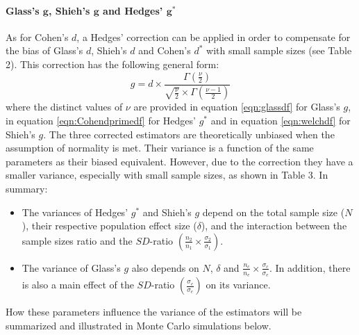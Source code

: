 \documentclass[
  12pt,
  french,
]{article}
\providecommand{\tightlist}{%
  \setlength{\itemsep}{0pt}\setlength{\parskip}{0pt}}
\begin{document}
\hypertarget{glasss-bmg-shiehs-bmg-and-hedges-bmg}{%
\paragraph{\texorpdfstring{Glass's \(\bm{g}\), Shieh's \(\bm{g}\) and
Hedges'
\(\bm{g^*}\)}{Glass's \textbackslash bm\{g\}, Shieh's \textbackslash bm\{g\} and Hedges' \textbackslash bm\{g\^{}*\}}}\label{glasss-bmg-shiehs-bmg-and-hedges-bmg}}

As for Cohen's \(d\), a Hedges' correction can be applied in order to
compensate for the bias of Glass's \(d\), Shieh's \(d\) and Cohen's
\(d^*\) with small sample sizes (see Table 2). This correction has the
following general form: \begin{equation*} 
g = d \times \frac{\Gamma(\frac{\nu}{2})}{\sqrt{\frac{\nu}{2}} \times \Gamma(\frac{\nu-1}{2})}
\end{equation*} where the distinct values of \(\nu\) are provided in
equation \ref{eqn:glassdf} for Glass's \(g\), in equation
\ref{eqn:Cohendprimedf} for Hedges' \(g^*\) and in equation
\ref{eqn:welchdf} for Shieh's \(g\). The three corrected estimators are
theoretically unbiased when the assumption of normality is met. Their
variance is a function of the same parameters as their biased
equivalent. However, due to the correction they have a smaller variance,
especially with small sample sizes, as shown in Table 3. In summary:

\begin{itemize}
\tightlist
\item
  The variances of Hedges' \(g^*\) and Shieh's \(g\) depend on the total
  sample size (\(N\)), their respective population effect size
  (\(\delta\)), and the interaction between the sample sizes ratio and
  the \(SD\)-ratio
  \(\left(\frac{n_2}{n_1}\times\frac{\sigma_2}{\sigma_1} \right)\).\\
\item
  The variance of Glass's \(g\) also depends on \(N\), \(\delta\) and
  \(\frac{n_c}{n_e}\times\frac{\sigma_c}{\sigma_e}\). In addition, there
  is also a main effect of the \(SD\)-ratio
  \(\left(\frac{\sigma_c}{\sigma_e} \right)\) on its variance.
\end{itemize}

How these parameters influence the variance of the estimators will be
summarized and illustrated in Monte Carlo simulations below.
\end{document}
